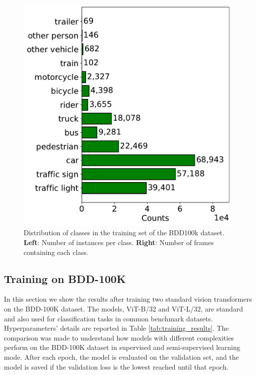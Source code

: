 \begin{figure}
\begin{minipage}{0.49\textwidth}
        \includegraphics[width=\textwidth]{images/bdd100k/frame_counts.pdf}
    \end{minipage}
    \caption[Distribution of classes in the training set of the BDD100k dataset.]
    {Distribution of classes in the training set of the BDD100k dataset.
    \textbf{Left}: Number of instances per class. 
    \textbf{Right}: Number of frames containing each class.
    }
    \label{fig:bdd100k_distribution}
\end{figure}

\subsection{Training on BDD-100K}
In this section we show the results after training two standard vision transformers 
on the BDD-100K dataset. The models, ViT-B/32 and ViT-L/32, are standard and 
also used for classification tasks in common benchmark datasets.
Hyperparameters' details are reported in Table \ref{tab:training_results}.
The comparison was made to understand how models with different complexities 
perform on the BDD-100K dataset in supervised and semi-supervised learning mode.
After each epoch, the model is evaluated on the validation set, and the model 
is saved if the validation loss is the lowest reached until that epoch.

